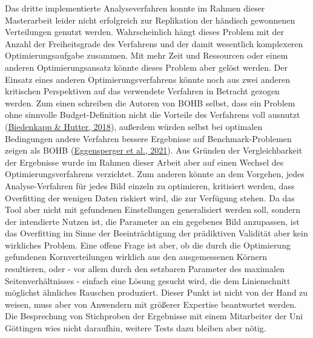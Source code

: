 \documentclass[
  12pt,
  openany]{book}
\begin{document}
Das dritte implementierte Analyseverfahren konnte im Rahmen dieser Masterarbeit leider nicht erfolgreich zur Replikation der händisch gewonnenen Verteilungen genutzt werden. Wahrscheinlich hängt dieses Problem mit der Anzahl der Freiheitsgrade des Verfahrens und der damit wesentlich komplexeren Optimierungsaufgabe zusammen. Mit mehr Zeit und Ressourcen oder einem anderen Optimierungsansatz könnte dieses Problem aber gelöst werden. \newline
Der Einsatz eines anderen Optimierungsverfahrens könnte noch aus zwei anderen kritischen Perspektiven auf das verwendete Verfahren in Betracht gezogen werden. Zum einen schreiben die Autoren von BOHB selbst, dass ein Problem ohne sinnvolle Budget-Definition nicht die Vorteile des Verfahrens voll ausnutzt (\protect\hyperlink{ref-biedenkappAutoMLBOHBRobust2018}{Biedenkapp \& Hutter, 2018}), außerdem würden selbst bei optimalen Bedingungen andere Verfahren bessere Ergebnisse auf Benchmark-Problemen zeigen als BOHB (\protect\hyperlink{ref-eggenspergerHPOBenchCollectionReproducible2021}{Eggensperger et al., 2021}). Aus Gründen der Vergleichbarkeit der Ergebnisse wurde im Rahmen dieser Arbeit aber auf einen Wechsel des Optimierungsverfahrens verzichtet.
Zum anderen könnte an dem Vorgehen, jedes Analyse-Verfahren für jedes Bild einzeln zu optimieren, kritisiert werden, dass Overfitting der wenigen Daten riskiert wird, die zur Verfügung stehen. Da das Tool aber nicht mit gefundenen Einstellungen generalisiert werden soll, sondern der intendierte Nutzen ist, die Parameter an ein gegebenes Bild anzupassen, ist das Overfitting im Sinne der Beeinträchtigung der prädiktiven Validität aber kein wirkliches Problem. Eine offene Frage ist aber, ob die durch die Optimierung gefundenen Kornverteilungen wirklich aus den ausgemessenen Körnern resultieren, oder - vor allem durch den setzbaren Parameter des maximalen Seitenverhältnisses - einfach eine Lösung gesucht wird, die dem Linienschnitt möglichst ähnliches Rauschen produziert. Dieser Punkt ist nicht von der Hand zu weisen, muss aber von Anwendern mit größerer Expertise beantwortet werden. Die Besprechung von Stichproben der Ergebnisse mit einem Mitarbeiter der Uni Göttingen wies nicht daraufhin, weitere Tests dazu bleiben aber nötig. \newline
\end{document}
